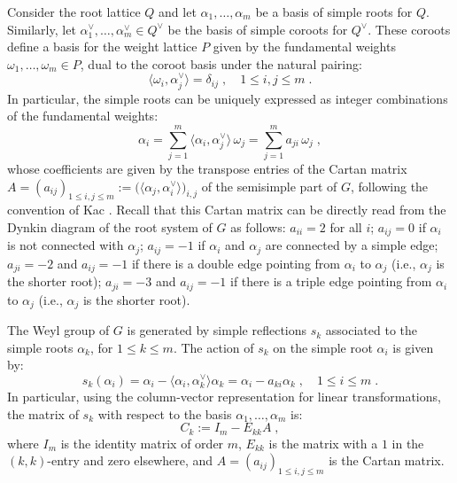 \documentclass[11pt,english]{amsart}
\numberwithin{equation}{section}
\numberwithin{figure}{section}
\theoremstyle{plain}
\theoremstyle{plain}
\theoremstyle{definition}
\theoremstyle{remark}
\begin{document}
Consider the root lattice $Q$ and let $\alpha_1,\ldots, \alpha_m$ be a basis of 
simple roots for $Q$. Similarly, let $\alpha_1^\vee, \dots, \alpha_m^\vee \in Q^\vee$ 
be the basis of simple coroots for $Q^{\vee}$. These coroots define a basis for 
the weight lattice $P$ given by the fundamental weights $\omega_1, \ldots, \omega_m \in P$, 
dual to the coroot basis under the natural pairing:
\[
\langle \omega_i, \alpha_j^{\vee}\rangle=\delta_{ij}\; , \quad 1\leq i,j\leq m\; .
\] 
In particular, the simple roots can be uniquely expressed as integer combinations 
of the fundamental weights:
\[
\alpha_i = \sum_{j=1}^m \langle \alpha_i, \alpha_j^\vee \rangle\,\omega_j = \sum_{j=1}^m a_{ji}\,\omega_j\; ,
\]
whose coefficients are given by the transpose entries of the Cartan matrix 
$A = (a_{ij})_{1 \leq i,j \leq m} := \big(\langle \alpha_j, \alpha_i^\vee \rangle\big)_{i,j}$ 
of the semisimple part of $G$, following the convention of Kac \cite{Kac1990}. 
Recall that this Cartan matrix can be directly read from the Dynkin diagram of the root system of $G$ as follows: 
$a_{ii} = 2$ for all $i$;
$a_{ij} = 0$ if $\alpha_i$ is not connected with $\alpha_j$;
$a_{ij} = -1$ if $\alpha_i$ and $\alpha_j$ are connected by a simple edge;
$a_{ji} = -2$ and $a_{ij} = -1$ if there is a double edge pointing from $\alpha_i$ to $\alpha_j$ (i.e., $\alpha_j$ is the shorter root);
$a_{ji} = -3$ and $a_{ij} = -1$ if there is a triple edge pointing from $\alpha_i$ to $\alpha_j$ (i.e., $\alpha_j$ is the shorter root).



The Weyl group of $G$ is generated by simple reflections $s_k$ associated to the 
simple roots $\alpha_k$, for $1\leq k\leq m$. The action of $s_k$ on the simple root $\alpha_i$ is given by:
\[
s_k(\alpha_i) = \alpha_i - \langle \alpha_i, \alpha_k^\vee \rangle \alpha_k = \alpha_i - a_{ki}\alpha_k\; , \quad 1\leq i\leq m\; .
\]
In particular, using the column-vector representation for linear transformations, the 
matrix of $s_k$ with respect to the basis $\alpha_1, \ldots, \alpha_m$ is:
\begin{equation}
\label{eq:matrix_Ck}
    C_{k} := I_m - E_{kk}A\; ,
\end{equation}
where $I_m$ is the identity matrix of order $m$, $E_{kk}$ is the matrix with a $1$ 
in the $(k,k)$-entry and zero elsewhere, and $A = (a_{ij})_{1 \le i,j \le m}$ is the Cartan matrix.
\end{document}
